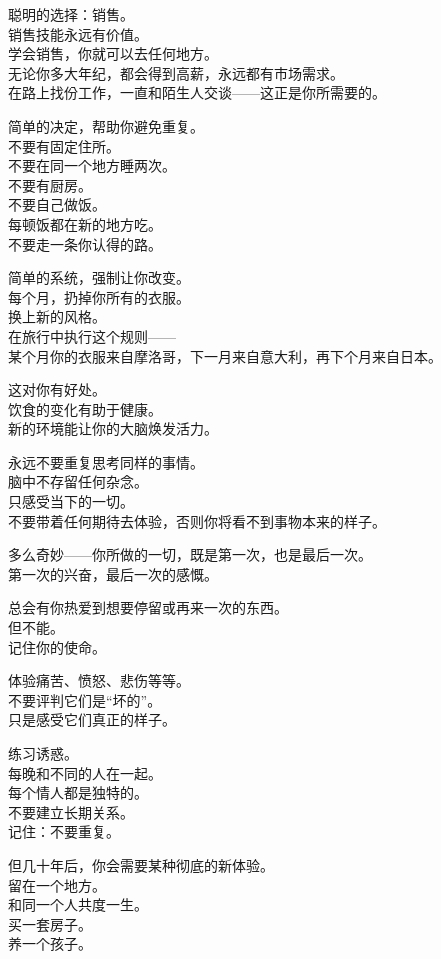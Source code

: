 \documentclass[
]{article}
\begin{document}
聪明的选择：销售。\\
销售技能永远有价值。\\
学会销售，你就可以去任何地方。\\
无论你多大年纪，都会得到高薪，永远都有市场需求。\\
在路上找份工作，一直和陌生人交谈------这正是你所需要的。

简单的决定，帮助你避免重复。\\
不要有固定住所。\\
不要在同一个地方睡两次。\\
不要有厨房。\\
不要自己做饭。\\
每顿饭都在新的地方吃。\\
不要走一条你认得的路。

简单的系统，强制让你改变。\\
每个月，扔掉你所有的衣服。\\
换上新的风格。\\
在旅行中执行这个规则------\\
某个月你的衣服来自摩洛哥，下一月来自意大利，再下个月来自日本。

这对你有好处。\\
饮食的变化有助于健康。\\
新的环境能让你的大脑焕发活力。

永远不要重复思考同样的事情。\\
脑中不存留任何杂念。\\
只感受当下的一切。\\
不要带着任何期待去体验，否则你将看不到事物本来的样子。

多么奇妙------你所做的一切，既是第一次，也是最后一次。\\
第一次的兴奋，最后一次的感慨。

总会有你热爱到想要停留或再来一次的东西。\\
但不能。\\
记住你的使命。

体验痛苦、愤怒、悲伤等等。\\
不要评判它们是``坏的''。\\
只是感受它们真正的样子。

练习诱惑。\\
每晚和不同的人在一起。\\
每个情人都是独特的。\\
不要建立长期关系。\\
记住：不要重复。

但几十年后，你会需要某种彻底的新体验。\\
留在一个地方。\\
和同一个人共度一生。\\
买一套房子。\\
养一个孩子。
\end{document}
